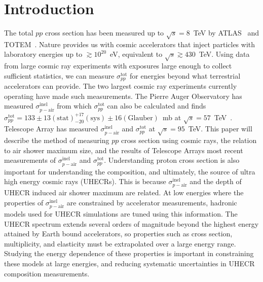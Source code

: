 \documentclass[12pt]{article}
\newcommand{\spptotal}{$\sigma_{pp}^{\mathrm{tot}}$}
\newcommand{\spairinel}{$\sigma_{p-\mathrm{air}}^{\mathrm{inel}}$}
\begin{document}
\section{Introduction}
The total $pp$ cross section has been measured up to $\sqrt{s} =
8$~TeV by ATLAS~\cite{Aaboud:2016ijx} and
TOTEM~\cite{Antchev:2016vpy}. Nature provides us with cosmic
accelerators that inject particles with laboratory energies up to
$\gtrsim 10^{20}$~eV, equivalent to $\sqrt{s} \gtrsim 430$~TeV. Using
data from large cosmic ray experiments with exposures large enough to
collect sufficient statistics, we can measure \spptotal{} for energies
beyond what terrestrial accelerators can provide. The two largest
cosmic ray experiments currently operating have made such
measurements. The Pierre Auger Observatory has measured \spairinel{}
from which \spptotal{} can also be calculated and finds
$\sigma_{pp}^{\mathrm{tot}} = 133 \pm
13(\mathrm{stat})^{+17}_{-20}(\mathrm{sys}) \pm
16(\mathrm{Glauber})$~mb at $\sqrt{s} =
57$~TeV~\cite{Collaboration:2012wt}. Telescope Array has measured
\spairinel{} and \spptotal{} at $\sqrt{s} = 95$~TeV. This paper will
describe the method of measuring $pp$ cross section using cosmic rays,
the relation to air shower maximum size, and the results of Telescope
Arrays most recent measurements of \spairinel{} and
\spptotal. Understanding proton cross section is also important for
understanding the composition, and ultimately, the source of ultra
high energy cosmic rays (UHECRs). This is because \spairinel{} and the
depth of UHECR induced air shower maximum are related. At low energies
where the properties of \spairinel{} are constrained by accelerator
measurements, hadronic models used for UHECR simulations are tuned
using this information. The UHECR spectrum extends several orders of
magnitude beyond the highest energy attained by Earth bound
accelerators, so properties such as cross section, multiplicity, and
elasticity must be extrapolated over a large energy range. Studying
the energy dependence of these properties is important in constraining
these models at large energies, and reducing systematic uncertainties
in UHECR composition measurements.
\end{document}
